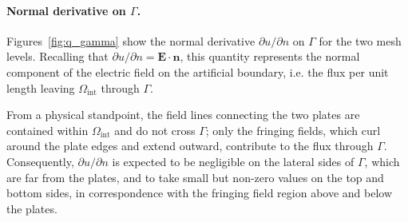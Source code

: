 \documentclass[11pt,onecolumn]{article}
\begin{document}
\paragraph{Normal derivative on $\Gamma$.}
Figures~\ref{fig:q_gamma} show the normal derivative $\partial u / \partial n$ on 
$\Gamma$ for the two mesh levels. Recalling that $\partial u / \partial n = \mathbf{E} 
\cdot \mathbf{n}$, this quantity represents the normal component of the electric field 
on the artificial boundary, i.e. the flux per unit length leaving $\Omega_{\text{int}}$ 
through $\Gamma$.

From a physical standpoint, the field lines connecting the two plates are contained 
within $\Omega_{\text{int}}$ and do not cross $\Gamma$; only the fringing fields, which 
curl around the plate edges and extend outward, contribute to the flux through $\Gamma$. 
Consequently, $\partial u / \partial n$ is expected to be negligible on the lateral sides 
of $\Gamma$, which are far from the plates, and to take small but non-zero values on the 
top and bottom sides, in correspondence with the fringing field region above and below 
the plates.
\end{document}
